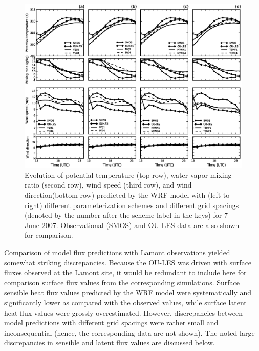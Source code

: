 \begin{figure}[ht!]
\begin{center}
\includegraphics[width=\textwidth]{figures/chapter4/meteogram_grid_20070607}
\end{center}
\caption{Evolution of potential temperature (top row), water vapor mixing ratio (second row), wind speed (third row), and wind direction(bottom row) predicted by the WRF model with (left to right) different parameterization schemes and different grid spacings (denoted by the number after the scheme label in the keys) for 7 June 2007. Observational (SMOS) and OU-LES data are also shown for comparison.}
\label{figure404}
\end{figure}


Comparison of model flux predictions with Lamont observations yielded somewhat striking discrepancies. Because the OU-LES was driven with surface fluxes observed at the Lamont site, it would be redundant to include here for comparison surface flux values from the corresponding simulations. Surface sensible heat flux values predicted by the WRF model were systematically and significantly lower as compared with the observed values, while surface latent heat flux values were grossly overestimated. However, discrepancies between model predictions with different grid spacings were rather small and inconsequential (hence, the corresponding data are not shown). The noted large discrepancies in sensible and latent flux values are discussed below. 

